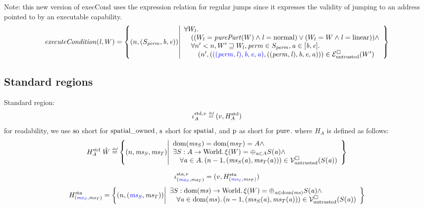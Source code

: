 \documentclass[a4paper]{article}
\begin{document}
Note: this new version of execCond uses the expression relation for regular jumps since it expresses the validity of jumping to an address pointed to by an executable capability. 
\[
  \execCond{\lin,W} = \left\{ \npair{(S_\perm,\baddr,\eaddr)} \middle|
    \begin{array}{l}
      \forall W_l \ldotp\\
      \quad ((W_l = \purePart{W} \wedge \lin = \normal) \vee (W_l = W \wedge \lin = \linear)) \wedge\\
      \quad \forall n' < n, W' \future W_l, \perm \in S_\perm, \aaddr \in [\baddr,\eaddr] \ldotp\\
      \qquad \npair[n']{\stpair[.]{((\perm,\lin),\baddr,\eaddr,\aaddr)}{((\perm,\lin),\baddr,\eaddr,\aaddr)}} \in \lre(W')
    \end{array}
    \right\}
\]

\subsection{Standard regions}
\label{sec:standard-regions}
Standard region:
\[
  \stdreg{A}{v} \defeq (v,H_A^{\mathrm{std}})
\]
for readability, we use $\spao$ short for $\spatialo$, $\spa$ short for $\spatial$, and $\pur$ as short for $\pure$.
where $H_A$ is defined as follows:
\[
  H_A^{\mathrm{std}} \; \hat{W} \defeq \left\{ \npair{\ms_S,\ms_T} \middle|
    \begin{array}{l}
      \dom(\ms_S) = \dom(\ms_T) = A \wedge \\
      \exists S : A \fun \World \ldotp \xi(W) = \oplus_{\aaddr \in A} S(\aaddr) \wedge\\
      \quad \forall \aaddr \in A \ldotp \npair[n-1]{(\ms_S(\aaddr),\ms_T(\aaddr))} \in \lrv(S(\aaddr))
    \end{array}
  \right\}
\]

\[
  \stareg{v} = (v,H^\mathrm{sta}_{\stpair{\ms}{\ms}})
\]
\[
  H^\mathrm{sta}_{\stpair{\ms}{\ms}} = \left\{ \npair{\stpair{\ms}{\ms}} \middle| 
    \begin{array}{l}
      \exists S : \dom(\ms) \fun \World \ldotp \xi(W) = \oplus_{\aaddr \in \dom(\ms)} S(\aaddr) \wedge\\
      \quad \forall \aaddr \in \dom(\ms) \ldotp \npair[n-1]{(\ms_S(\aaddr),\ms_T(\aaddr))} \in \lrv(S(\aaddr))
    \end{array}
\right\}
\]
\end{document}
